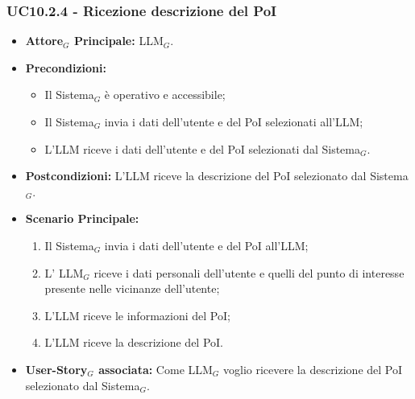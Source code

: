 \documentclass[10pt]{article}
\begin{document}
\begin{justify}
\subsubsection{\textbf{UC10.2.4 - Ricezione descrizione del PoI}}
\begin{itemize}
    \item \textbf{Attore$_G$ Principale:} LLM$_G$.
    \item \textbf{Precondizioni:} 
        \begin{itemize}
          \item Il Sistema$_G$ è operativo e accessibile;
          \item Il Sistema$_G$ invia i dati dell'utente e del PoI selezionati all'LLM;
            \item L'LLM riceve i dati dell'utente e del PoI selezionati dal Sistema$_G$.
        \end{itemize}
      \item \textbf{Postcondizioni:} L'LLM riceve la descrizione del PoI selezionato dal Sistema$_G$.
    \item \textbf{Scenario Principale:} 
        \begin{enumerate}
          \item Il Sistema$_G$ invia i dati dell'utente e del PoI all'LLM;
        \item L' LLM$_G$ riceve i dati personali dell'utente e quelli del punto di interesse presente nelle vicinanze dell'utente;
          \item L'LLM riceve le informazioni del PoI;
          \item L'LLM riceve la descrizione del PoI.
        \end{enumerate}
      \item \textbf{User-Story$_G$ associata:} Come LLM$_G$ voglio ricevere la descrizione del PoI selezionato dal Sistema$_G$.
\end{itemize}

\end{justify}
\end{document}
